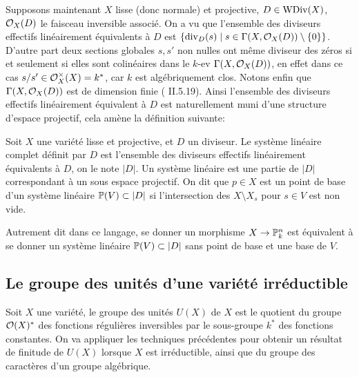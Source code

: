 Supposons maintenant $X$ lisse (donc normale) et projective, $D\in \operatorname{WDiv}(X)$, $\mathcal{O}_X(D)$ le faisceau inversible associé. On a vu que l'ensemble des diviseurs effectifs linéairement équivalents à $D$ est $\lbrace \operatorname{div}_D(s)\mid s\in\Gamma(X,\mathcal{O}_X(D))\setminus\lbrace0\rbrace \rbrace$. D'autre part deux sections globales $s, s'$ non nulles ont même diviseur des zéros si et seulement si elles sont colinéaires dans le $k$-ev $\Gamma(X, \mathcal{O}_X(D))$, en effet dans ce cas $s/s'\in \mathcal{O}_X^\times(X)=k^*$, car $k$ est algébriquement clos. Notons enfin que $\Gamma(X, \mathcal{O}_X(D))$ est de dimension finie (\cite{Hartshorne} II.5.19). Ainsi l'ensemble des diviseurs effectifs linéairement équivalent à $D$ est naturellement muni d'une structure d'espace projectif, cela amène la définition suivante:
\begin{defn}
Soit $X$ une variété lisse et projective, et $D$ un diviseur. Le système linéaire complet définit par $D$ est l'ensemble des diviseurs effectifs linéairement équivalents à $D$, on le note $|D|$. Un système linéaire est une partie de $|D|$ correspondant à un sous espace projectif. On dit que $p\in X$ est un point de base d'un système linéaire $\mathbb{P}(V)\subset |D|$ si l'intersection des $X\setminus X_s$ pour $s\in V$ est non vide. 
\end{defn}

Autrement dit dans ce langage, se donner un morphisme $X\rightarrow \mathbb{P}^n_k$ est équivalent à se donner un système linéaire $\mathbb{P}(V)\subset |D|$ sans point de base et une base de $V$.


\subsection{Le groupe des unités d'une variété irréductible}
\label{unitGroupFiniteType}


Soit $X$ une variété, le groupe des unités $U(X)$ de $X$ est le quotient du groupe $\mathcal{O}(X)^*$ des fonctions régulières inversibles par le sous-groupe $k^*$ des fonctions constantes. On va appliquer les techniques précédentes pour obtenir un résultat de finitude de $U(X)$ lorsque $X$ est irréductible, ainsi que du groupe des caractères d'un groupe algébrique.

